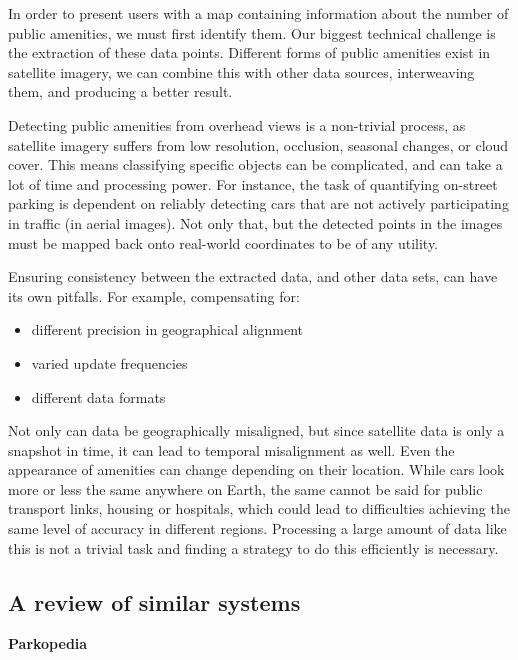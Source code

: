\noindent{}In order to present users with a map containing information about the
number of public amenities, we must first identify them. Our biggest technical
challenge is the extraction of these data points. Different forms of public
amenities exist in satellite imagery, we can combine this with other data
sources, interweaving them, and producing a better result.

\noindent{}Detecting public amenities from overhead views is a non-trivial process,
as satellite imagery suffers from low resolution, occlusion, seasonal changes, or
cloud cover. This means classifying specific objects can be complicated, and can
take a lot of time and processing power. For instance, the task of quantifying
on-street parking is dependent on reliably detecting cars that are not actively
participating in traffic (in aerial images). Not only that, but the detected
points in the images must be mapped back onto real-world coordinates to be of
any utility.

\noindent{}Ensuring consistency between the extracted data, and other data sets,
can have its own pitfalls. For example, compensating for:

\vspace{-3mm}
\begin{itemize}
  \item{different precision in geographical alignment}
  \item{varied update frequencies}
  \item{different data formats}
\end{itemize}
\vspace{-3mm}

\noindent{}Not only can data be geographically misaligned, but since satellite
data is only a snapshot in time, it can lead to temporal misalignment as well.
Even the appearance of amenities can change depending on their location. While
cars look more or less the same anywhere on Earth, the same cannot be said for
public transport links, housing or hospitals, which could lead to difficulties
achieving the same level of accuracy in different regions. Processing a large
amount of data like this is not a trivial task and finding a strategy to do
this efficiently is necessary.

\subsection{A review of similar systems}

\noindent{}\textbf{Parkopedia}

